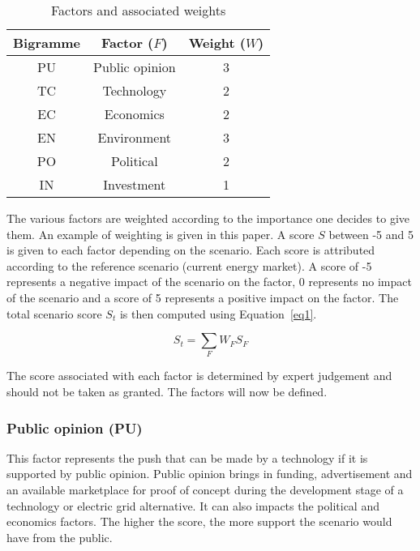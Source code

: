 \documentclass[IJPHM, 2017, 29]{PHMSociety}
\begin{document}
\setlength\extrarowheight{5pt}
\begin{table}[]
\centering
\caption{Factors and associated weights}
\label{tab1}
\begin{tabular}{|c|c|c|}
\hline
Bigramme & Factor ($F$)               & Weight ($W$) \\ \hline
PU & Public opinion           & 3      \\ \hline
TC & Technology               & 2      \\ \hline
EC & Economics                & 2      \\ \hline
EN & Environment              & 3      \\ \hline
PO & Political                & 2      \\ \hline
IN & Investment               & 1      \\ \hline
\end{tabular}
\end{table}

The various factors are weighted according to the importance one decides to give them. An example of weighting is given in this paper. A score $S$ between -5 and 5 is given to each factor depending on the scenario. Each score is attributed according to the reference scenario (current energy market). A score of -5 represents a negative impact of the scenario on the factor, 0 represents no impact of the scenario and a score of 5 represents a positive impact on the factor. The total scenario score $S_t$ is then computed using Equation~\ref{eq1}.

\begin{equation}
\label{eq1}
S_t = \sum_F {W_F S_F}
\end{equation}

The score associated with each factor is determined by expert judgement and should not be taken as granted. The factors will now be defined.

\subsubsection{Public opinion (PU)}

This factor represents the push that can be made by a technology if it is supported by public opinion. Public opinion brings in funding, advertisement and an available marketplace for proof of concept during the development stage of a technology or electric grid alternative. It can also impacts the political and economics factors. The higher the score, the more support the scenario would have from the public.
\end{document}
